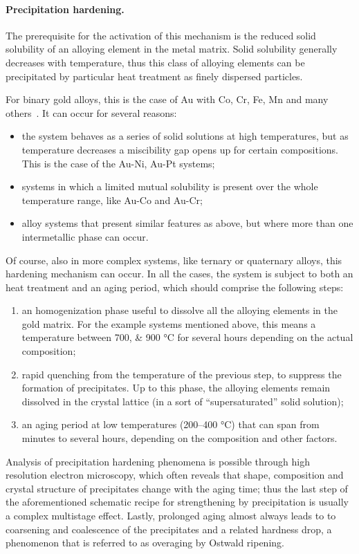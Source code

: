 \paragraph{Precipitation hardening.} 
The prerequisite for the activation of this mechanism is the reduced solid solubility of an alloying element in the metal matrix. Solid solubility generally decreases with temperature, thus this class of alloying elements can be precipitated by particular heat treatment as finely dispersed particles.

For binary gold alloys, this is the case of Au with Co, Cr, Fe, Mn and many others~\cite{OkamotoBOOK1987}. It can occur for several reasons:
\begin{itemize}
    \item the system behaves as a series of solid solutions at high temperatures, but as temperature decreases a miscibility gap opens up for certain compositions. This is the case of the Au-Ni, Au-Pt systems;
    \item systems in which a limited mutual solubility is present over the whole temperature range, like Au-Co and Au-Cr;
    \item alloy systems that present similar features as above, but where more than one intermetallic phase can occur.
\end{itemize}

Of course, also in more complex systems, like ternary or quaternary alloys, this hardening mechanism can occur. In all the cases, the system is subject to both an heat treatment and an aging period, which should comprise the following steps:
\begin{enumerate}
    \item an homogenization phase useful to dissolve all the alloying elements in the gold matrix. For the example systems mentioned above, this means a temperature between \numlist{700;900} \si{\celsius} for several hours depending on the actual composition;
    \item rapid quenching from the temperature of the previous step, to suppress the formation of precipitates. Up to this phase, the alloying elements remain dissolved in the crystal lattice (in a sort of ``supersaturated'' solid solution);
    \item an aging period at low temperatures (\num{200}--\num{400} \si{\celsius}) that can span from minutes to several hours, depending on the composition and other factors.
\end{enumerate}

Analysis of precipitation hardening phenomena is possible through high resolution electron microscopy, which often reveals that shape, composition and crystal structure of precipitates change with the aging time; thus the last step of the aforementioned schematic recipe for strengthening by precipitation is usually a complex multistage effect. Lastly, prolonged aging almost always leads to to coarsening and coalescence of the precipitates and a related hardness drop, a phenomenon that is referred to as overaging by Ostwald ripening.









 